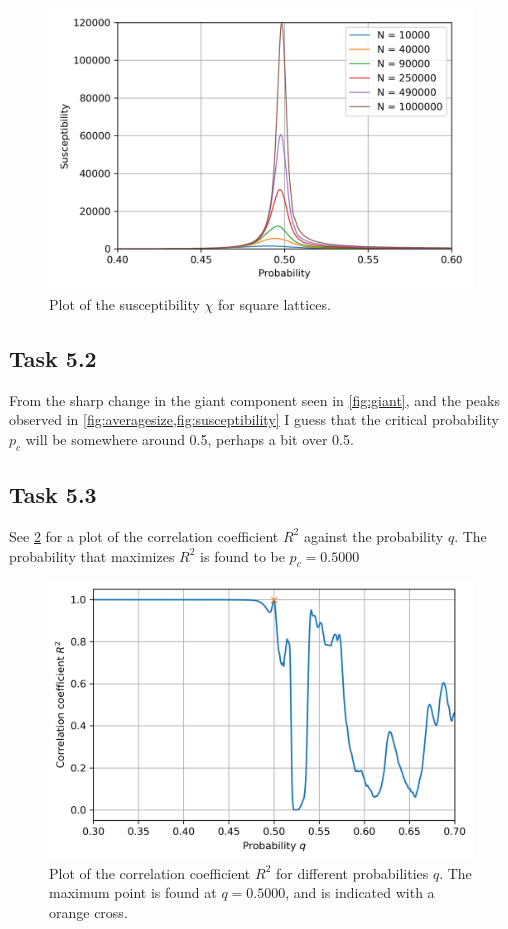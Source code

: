 \documentclass[a4paper]{article}
\begin{document}
\begin{figure}[h]
    \centering
    \includegraphics[width=\textwidth]{susceptibility.png}
    \caption{Plot of the susceptibility $\chi$ for square lattices. \label{fig:susceptibility}}
\end{figure}

\subsection*{Task 5.2}
From the sharp change in the giant component seen in \cref{fig:giant}, and the peaks observed in \cref{fig:averagesize,fig:susceptibility} I guess that the critical probability $p_c$ will be somewhere around 0.5, perhaps a bit over 0.5.
\FloatBarrier

\subsection*{Task 5.3}
See \cref{fig:rsquared} for a plot of the correlation coefficient $R^2$ against the probability $q$. The probability that maximizes $R^2$ is found to be $p_c = 0.5000$

\begin{figure}[h]
    \centering
    \includegraphics[width=\textwidth]{rsquared.png}
    \caption{Plot of the correlation coefficient $R^2$ for different probabilities $q$. The maximum point is found at $q = 0.5000$, and is indicated with a orange cross. \label{fig:rsquared}}
\end{figure}
\end{document}
